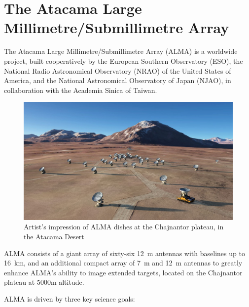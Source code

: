 \section{The Atacama Large Millimetre/Submillimetre Array}

The Atacama Large Millimetre/Submillimetre Array (ALMA) %
is a worldwide project, %
built cooperatively by the European Southern Observatory (ESO), the National Radio Astronomical Observatory (NRAO) of the United States of America, and the National Astronomical Observatory of Japan (NJAO), in collaboration with the Academia Sinica of Taiwan.

 \begin{figure}[tb]
 \centering
 \includegraphics[width=\textwidth]{images/alma.jpg}
 \caption{Artist's impression of ALMA dishes at the Chajnantor plateau, in the Atacama Desert}
 \end{figure}


ALMA
consists of a giant array of
sixty-six
12~m antennas with baselines up to
16~km,
and an additional compact array of
7~m
and
12~m antennas to greatly enhance ALMA's ability to image extended targets, located on the Chajnantor plateau at 5000m altitude.

ALMA is driven by three key science goals:

